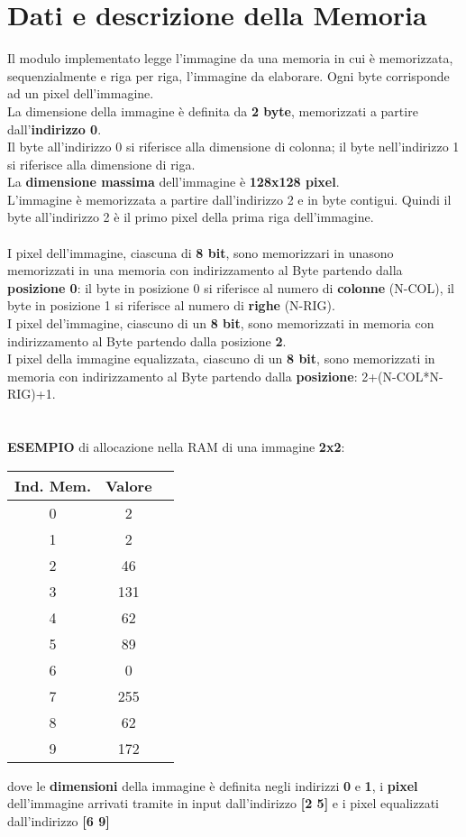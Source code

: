 \documentclass[a4paper, 12pt]{report}
\begin{document}
		\section{Dati e descrizione della Memoria}
			Il modulo implementato legge l’immagine da una memoria in cui è memorizzata,
			sequenzialmente e riga per riga, l’immagine da elaborare. Ogni byte corrisponde ad un pixel
			dell’immagine.\\
			La dimensione della immagine è definita da \textbf{2 byte}, memorizzati a partire dall’\textbf{indirizzo 0}.\\ Il
			byte all’indirizzo 0 si riferisce alla dimensione di colonna; il byte nell’indirizzo 1 si riferisce
			alla dimensione di riga.\\ La \textbf{dimensione massima} dell’immagine è \textbf{128x128 pixel}.\\
			L’immagine è memorizzata a partire dall’indirizzo 2 e in byte contigui. Quindi il byte
			all’indirizzo 2 è il primo pixel della prima riga dell’immagine.\\\\
			I pixel dell'immagine, ciascuna di \textbf{8 bit}, sono memorizzari in unasono memorizzati in una
			memoria con indirizzamento al Byte partendo dalla \textbf{posizione 0}: il byte in posizione 0 si
			riferisce al numero di \textbf{colonne} (N-COL), il byte in posizione 1 si riferisce al numero di \textbf{righe}
			(N-RIG).\\
			I pixel del’immagine, ciascuno di un \textbf{8 bit}, sono memorizzati in memoria con indirizzamento
			al Byte partendo dalla posizione \textbf{2}.\\
			I pixel della immagine equalizzata, ciascuno di un \textbf{8 bit}, sono memorizzati in memoria con
			indirizzamento al Byte partendo dalla \textbf{posizione}: 2+(N-COL*N-RIG)+1.\\\\\\
			\textbf{ESEMPIO} di allocazione nella RAM di una immagine \textbf{2x2}:\\\par
				\begin{center}
				\begin{tabular}{|c | c|l}
					 \hline Ind. Mem. & Valore \\ \hline 
								0 & 2\\ \hline
								1 & 2\\ \hline
								2 & 46\\ \hline
								3 & 131\\ \hline
								4 &	62 \\ \hline
								5 & 89\\ \hline
								6 & 0\\ \hline
								7 & 255\\ \hline
								8 & 62 \\ \hline
								9 & 172\\ \hline
				\end{tabular}
				\end{center}
				dove le 
				\textbf{dimensioni} della immagine è definita negli indirizzi \textbf{0} e \textbf{1}, i \textbf{pixel} dell'immagine arrivati tramite in input dall'indirizzo \textbf{[2 5]} 
				e i pixel equalizzati dall'indirizzo \textbf{[6 9]} 
\end{document}
